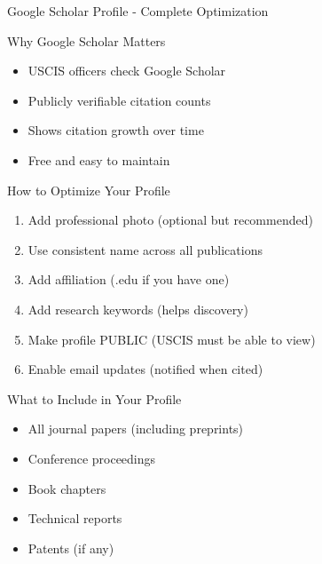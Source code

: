 \documentclass[11pt]{beamer}
\begin{document}
				\begin{frame}{Google Scholar Profile - Complete Optimization}
					\scriptsize
					\begin{block}{Why Google Scholar Matters}
						\begin{itemize}
							\item USCIS officers check Google Scholar
							\item Publicly verifiable citation counts
							\item Shows citation growth over time
							\item Free and easy to maintain
						\end{itemize}
					\end{block}
					\begin{block}{How to Optimize Your Profile}
						\begin{enumerate}
							\item Add professional photo (optional but recommended)
							\item Use consistent name across all publications
							\item Add affiliation (.edu if you have one)
							\item Add research keywords (helps discovery)
							\item Make profile PUBLIC (USCIS must be able to view)
							\item Enable email updates (notified when cited)
						\end{enumerate}
					\end{block}
					\begin{block}{What to Include in Your Profile}
						\begin{itemize}
							\item All journal papers (including preprints)
							\item Conference proceedings
							\item Book chapters
							\item Technical reports
							\item Patents (if any)
						\end{itemize}
					\end{block}
				\end{frame}
				
\end{document}
